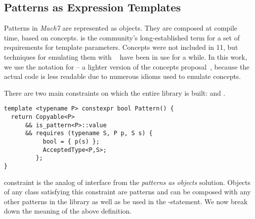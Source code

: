 \subsection{Patterns as Expression Templates}
\label{sec:pat}

Patterns in \emph{Mach7} are represented as objects. They are composed
 at compile time, based on \Cpp{} concepts. 
 is the \Cpp{} community's long-established term for a set of 
requirements for template parameters. Concepts were not included in \Cpp{}11, 
but techniques for emulating them with 
~\cite{jarvi:03:cuj_arbitrary_overloading} have been in use for 
a while. In this work, we use the notation for  -- a 
lighter version of the concepts proposal~\cite{N3580}, because the actual code 
is less readable due to numerous idioms used to emulate concepts.

There are two main constraints on which the entire library is built: 
 and .

\begin{lstlisting}
template <typename P> constexpr bool Pattern() {
  return Copyable<P>
      && is_pattern<P>::value
      && requires (typename S, P p, S s) {
           bool = { p(s) };
           AcceptedType<P,S>;
         };
}
\end{lstlisting}


\noindent
{} constraint is the analog of  interface from the 
\emph{patterns as objects} solution. Objects of any class  satisfying 
this constraint are patterns and can be composed with any other patterns in the 
library as well as be used in the -statement. We now break down the 
meaning of the above definition.

